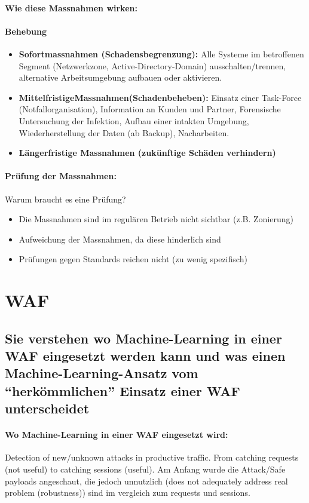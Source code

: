 \documentclass[10pt,a4paper]{article}
\begin{document}
\paragraph*{Wie diese Massnahmen wirken:}
\paragraph*{Behebung}
\begin{itemize}[noitemsep,topsep=0pt,leftmargin=*]
	\item \textbf{Sofortmassnahmen (Schadensbegrenzung):} Alle Systeme im betroffenen Segment (Netzwerkzone, Active-Directory-Domain) ausschalten/trennen, alternative Arbeitsumgebung aufbauen oder aktivieren.
	\item \textbf{MittelfristigeMassnahmen(Schadenbeheben):} Einsatz einer Task-Force (Notfallorganisation), Information an Kunden und Partner, Forensische Untersuchung der Infektion, Aufbau einer intakten Umgebung, Wiederherstellung der Daten (ab Backup), Nacharbeiten.
	\item \textbf{Längerfristige Massnahmen (zukünftige Schäden verhindern)}
\end{itemize}
\paragraph*{Prüfung der Massnahmen:} Warum braucht es eine Prüfung?
\begin{itemize}[noitemsep,topsep=0pt,leftmargin=*]
    \item Die Massnahmen sind im regulären Betrieb nicht sichtbar (z.B. Zonierung)
    \item Aufweichung der Massnahmen, da diese hinderlich sind
    \item Prüfungen gegen Standards reichen nicht (zu wenig spezifisch)
\end{itemize}


\pagebreak
\section{WAF}
\subsection*{Sie verstehen wo Machine-Learning in einer WAF eingesetzt werden kann und was einen Machine-Learning-Ansatz vom "`herkömmlichen"' Einsatz einer WAF unterscheidet}
\paragraph*{Wo Machine-Learning in einer WAF eingesetzt wird:} Detection of new/unknown attacks in productive traffic. From catching requests (not useful) to catching sessions (useful). Am Anfang wurde die Attack/Safe payloads angeschaut, die jedoch unnutzlich (does not adequately address real problem (robustness)) sind im vergleich zum requests und sessions.
\end{document}
